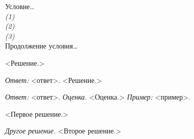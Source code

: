 Условие\ldots
\\\emph{(1)}
\\\emph{(2)}
\\\emph{(3)}
\\
Продолжение условия\ldots

\solution
<Решение.>

\solution
\emph{Ответ:} <ответ>.
<Решение.>

\solution
\emph{Ответ:} <ответ>.
\emph{Оценка.}
<Оценка.>
\emph{Пример:} <пример>.

\solution
<Первое решение.>
\par
\emph{Другое решение.}
<Второе решение.>

%

